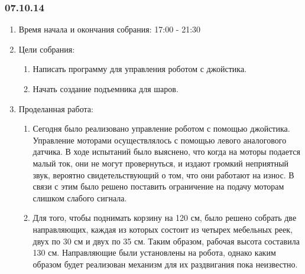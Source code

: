 
\subsubsection{07.10.14}

\begin{enumerate}
	\item Время начала и окончания собрания:
	17:00 - 21:30
	\item Цели собрания:
	\begin{enumerate}
	  \item Написать программу для управления роботом с джойстика.
	  
	  \item Начать создание подъемника для шаров.
	  
    \end{enumerate}
	\item Проделанная работа:
	\begin{enumerate}
	  \item Сегодня было реализовано управление роботом с помощью джойстика. Управление моторами осуществлялось с помощью левого аналогового датчика. В ходе испытаний было выяснено, что когда на моторы подается малый ток, они не могут провернуться, и издают громкий неприятный звук, вероятно свидетельствующий о том, что они работают на износ. В связи с этим было решено поставить ограничение на подачу моторам слишком слабого сигнала.
      
      \item  Для того, чтобы поднимать корзину на 120 см, было решено собрать две направляющих, каждая из которых состоит из четырех мебельных реек, двух по 30 см и двух по 35 см. Таким образом, рабочая высота составила 130 см. Направляющие были установлены на робота, однако каким образом будет реализован механизм для их раздвигания пока неизвестно.
      

\end{enumerate}
\end{enumerate}

